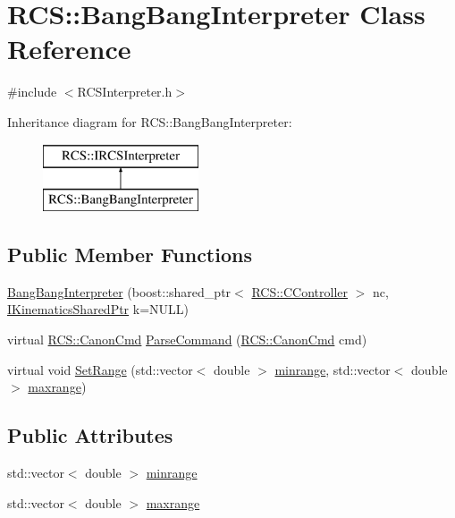 \hypertarget{classRCS_1_1BangBangInterpreter}{\section{R\-C\-S\-:\-:Bang\-Bang\-Interpreter Class Reference}
\label{classRCS_1_1BangBangInterpreter}
}


{\ttfamily \#include $<$R\-C\-S\-Interpreter.\-h$>$}

Inheritance diagram for R\-C\-S\-:\-:Bang\-Bang\-Interpreter\-:\begin{figure}[H]
\begin{center}
\leavevmode
\includegraphics[height=2.000000cm]{classRCS_1_1BangBangInterpreter}
\end{center}
\end{figure}
\subsection*{Public Member Functions}
\begin{DoxyCompactItemize}
\item 
\hyperlink{classRCS_1_1BangBangInterpreter_af5d124c1c3ba7865155018a1f3415695}{Bang\-Bang\-Interpreter} (boost\-::shared\-\_\-ptr$<$ \hyperlink{structRCS_1_1CController}{R\-C\-S\-::\-C\-Controller} $>$ nc, \hyperlink{Kinematics_8h_aa720b9842c846588baf215581fb9f902}{I\-Kinematics\-Shared\-Ptr} k=N\-U\-L\-L)
\item 
virtual \hyperlink{structRCS_1_1CanonCmd}{R\-C\-S\-::\-Canon\-Cmd} \hyperlink{classRCS_1_1BangBangInterpreter_a7a5611f4e162defa15aeb1d503c7f3cb}{Parse\-Command} (\hyperlink{structRCS_1_1CanonCmd}{R\-C\-S\-::\-Canon\-Cmd} cmd)
\item 
virtual void \hyperlink{classRCS_1_1BangBangInterpreter_a69cc779236827f55ff895019e4833209}{Set\-Range} (std\-::vector$<$ double $>$ \hyperlink{classRCS_1_1BangBangInterpreter_a83562103bf03ffe4de00cd3a2f06c772}{minrange}, std\-::vector$<$ double $>$ \hyperlink{classRCS_1_1BangBangInterpreter_a4e10b3c84dfeb87228da9eb62be855c0}{maxrange})
\end{DoxyCompactItemize}
\subsection*{Public Attributes}
\begin{DoxyCompactItemize}
\item 
std\-::vector$<$ double $>$ \hyperlink{classRCS_1_1BangBangInterpreter_a83562103bf03ffe4de00cd3a2f06c772}{minrange}
\item 
std\-::vector$<$ double $>$ \hyperlink{classRCS_1_1BangBangInterpreter_a4e10b3c84dfeb87228da9eb62be855c0}{maxrange}
\end{DoxyCompactItemize}
